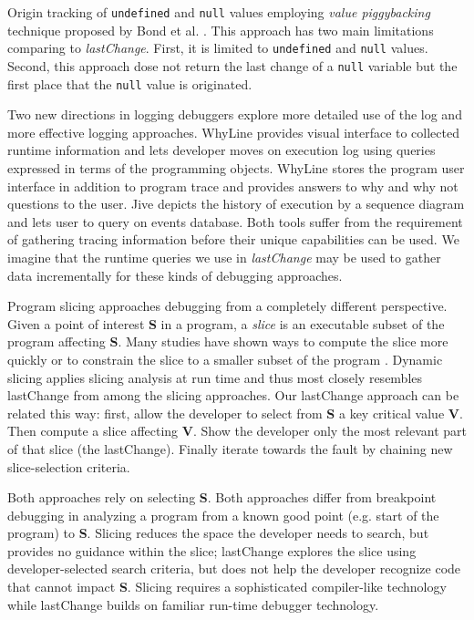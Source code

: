 \documentclass{sig-alternate}
\begin{document}
Origin tracking of \texttt{undefined} and \texttt{null} values employing \textit{value piggybacking} technique proposed by
Bond et al. \cite{Bond}. This approach has two main limitations comparing to \textit{lastChange}.
First, it is limited to \texttt{undefined} and \texttt{null} values. Second, this approach dose not return the last change
of a \texttt{null} variable but the first place that the \texttt{null} value is originated.

Two new directions in logging debuggers explore more detailed use of
the log and more effective logging approaches. WhyLine\cite{Ko}
provides visual interface to collected runtime information and lets
developer moves on execution log using queries expressed in terms of
the programming objects. WhyLine stores the program user interface in
addition to program trace and provides answers to why and why not
questions to the user. Jive\cite{Czyz} depicts the history of
execution by a sequence diagram and lets user to query on events
database. Both tools suffer from the requirement of gathering tracing information before their unique capabilities can be used.
We imagine that the runtime queries we use in \textit{lastChange}  may be used to gather data incrementally for these kinds of debugging approaches.

Program slicing\cite{Weiser} approaches debugging from a completely different perspective. Given a point of interest {\bf S} in a program, a \textit{slice} is an executable subset of the program affecting {\bf S}.  Many studies have shown ways to compute the slice more quickly or to constrain the slice to a smaller subset of the program \cite{Horwitz, Sridharan}.  Dynamic slicing \cite{Korel} applies slicing analysis at run time and thus most closely resembles lastChange from among the slicing approaches.  Our lastChange approach can be related this way: first, allow the developer to select from {\bf S} a key critical value {\bf V}. Then compute a slice affecting {\bf V}. Show the developer only the most relevant part of that slice (the lastChange). Finally iterate towards the fault by chaining new slice-selection criteria.

Both approaches rely on selecting {\bf S}. Both approaches differ from breakpoint debugging in analyzing a program from a known good point (e.g. start of the program) to {\bf S}.  Slicing reduces the space the developer needs to search, but provides no guidance within the slice; lastChange explores the slice using developer-selected search criteria, but does not help the developer recognize code that cannot impact {\bf S}. Slicing requires a sophisticated compiler-like technology while lastChange builds on familiar run-time debugger technology. 
\end{document}
